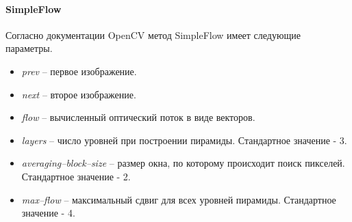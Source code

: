 \paragraph{SimpleFlow}
Согласно документации OpenCV метод SimpleFlow имеет следующие параметры.
\begin{itemize}
\item \textit{prev} – первое изображение.
\item \textit{next} – второе изображение.
\item \textit{flow} – вычисленный оптический поток в виде векторов. 
\item \textit{layers} – число уровней при построении пирамиды. Стандартное значение - 3.
\item \textit{averaging--block--size} – размер окна, по которому происходит поиск пикселей. Стандартное значение - 2. 
\item \textit{max--flow} – максимальный сдвиг для всех уровней пирамиды. Стандартное значение - 4.
\end{itemize}

